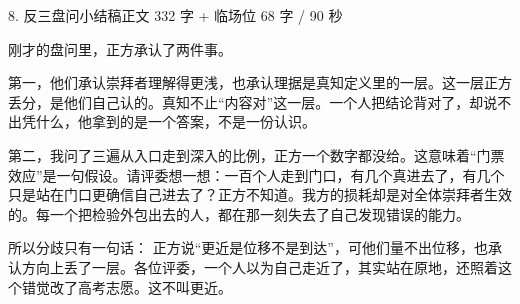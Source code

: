 \documentclass[script,con]{debate}
\begin{document}
\begin{speech}{8. 反三盘问小结稿}{正文 332 字 + 临场位 68 字 / 90 秒}

刚才的盘问里，正方承认了两件事。

第一，他们承认崇拜者理解得更浅，也承认理据是真知定义里的一层。这一层正方丢分，是他们自己认的。真知不止“内容对”这一层。一个人把结论背对了，却说不出凭什么，他拿到的是一个答案，不是一份认识。

第二，我问了三遍从入口走到深入的比例，正方一个数字都没给。这意味着“门票效应”是一句假设。请评委想一想：一百个人走到门口，有几个真进去了，有几个只是站在门口更确信自己进去了？正方不知道。我方的损耗却是对全体崇拜者生效的。每一个把检验外包出去的人，都在那一刻失去了自己发现错误的能力。

所以分歧只有一句话： 正方说“更近是位移不是到达”，可他们量不出位移，也承认方向上丢了一层。各位评委，一个人以为自己走近了，其实站在原地，还照着这个错觉改了高考志愿。这不叫更近。

\end{speech}
\end{document}
